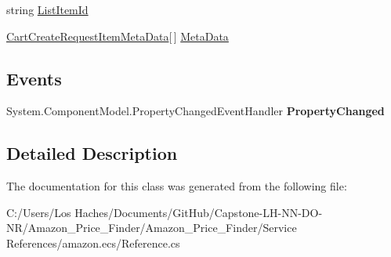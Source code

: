 \begin{DoxyCompactItemize}
\begin{DoxyCompactList}\small\item\em \end{DoxyCompactList}\item 
\hypertarget{class_amazon___price___finder_1_1amazon_1_1ecs_1_1_cart_create_request_item_af145b8f3c2cab7d13ec303e688d735b8}{string \hyperlink{class_amazon___price___finder_1_1amazon_1_1ecs_1_1_cart_create_request_item_af145b8f3c2cab7d13ec303e688d735b8}{List\-Item\-Id}}\label{class_amazon___price___finder_1_1amazon_1_1ecs_1_1_cart_create_request_item_af145b8f3c2cab7d13ec303e688d735b8}

\begin{DoxyCompactList}\small\item\em \end{DoxyCompactList}\item 
\hypertarget{class_amazon___price___finder_1_1amazon_1_1ecs_1_1_cart_create_request_item_afeb6b6727d6064ca63b7472ecd2a50be}{\hyperlink{class_amazon___price___finder_1_1amazon_1_1ecs_1_1_cart_create_request_item_meta_data}{Cart\-Create\-Request\-Item\-Meta\-Data}\mbox{[}$\,$\mbox{]} \hyperlink{class_amazon___price___finder_1_1amazon_1_1ecs_1_1_cart_create_request_item_afeb6b6727d6064ca63b7472ecd2a50be}{Meta\-Data}}\label{class_amazon___price___finder_1_1amazon_1_1ecs_1_1_cart_create_request_item_afeb6b6727d6064ca63b7472ecd2a50be}

\begin{DoxyCompactList}\small\item\em \end{DoxyCompactList}\end{DoxyCompactItemize}
\subsection*{Events}
\begin{DoxyCompactItemize}
\item 
\hypertarget{class_amazon___price___finder_1_1amazon_1_1ecs_1_1_cart_create_request_item_a59cadb98ee4d415eea993065181d3e5b}{System.\-Component\-Model.\-Property\-Changed\-Event\-Handler {\bfseries Property\-Changed}}\label{class_amazon___price___finder_1_1amazon_1_1ecs_1_1_cart_create_request_item_a59cadb98ee4d415eea993065181d3e5b}

\end{DoxyCompactItemize}


\subsection{Detailed Description}


The documentation for this class was generated from the following file\-:\begin{DoxyCompactItemize}
\item 
C\-:/\-Users/\-Los Haches/\-Documents/\-Git\-Hub/\-Capstone-\/\-L\-H-\/\-N\-N-\/\-D\-O-\/\-N\-R/\-Amazon\-\_\-\-Price\-\_\-\-Finder/\-Amazon\-\_\-\-Price\-\_\-\-Finder/\-Service References/amazon.\-ecs/Reference.\-cs\end{DoxyCompactItemize}
